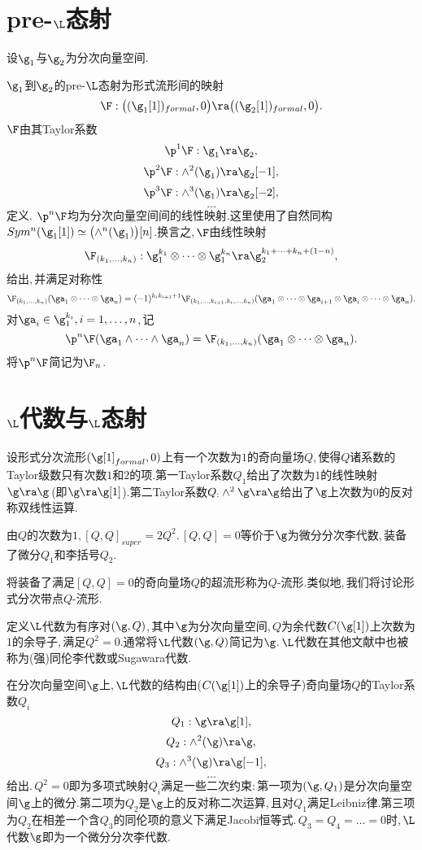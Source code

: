 \section{pre-$\L$态射}

设$\g_1$与$\g_2$为分次向量空间.

$\g_1$到$\g_2$的pre-$\L$态射为形式流形间的映射
$$\F:\bigl((\g_1[1])_{formal},0\bigr)\ra \bigl((\g_2[1])_{formal},0\bigr).$$
$\F$由其Taylor系数
$$\p^1 \F:\g_1\ra \g_2,$$
$$\p^2 \F:\wedge^2(\g_1)\ra \g_2[-1],$$
$$\p^3 \F:\wedge^3(\g_1)\ra \g_2[-2],$$
 $$\dots$$
定义.\,\,$\p^n \F$均为分次向量空间间的线性映射.这里使用了自然同构\\
$Sym^n(\g_1[1])\simeq 
\bigl(\wedge ^n(\g_1)\bigr)[n]$.换言之,\,$\F$由线性映射
$$\F_{(k_1,\dots,k_n)}: \g_1^{k_1}\otimes\dots\otimes \g_1^{k_n}\ra 
   \g_2^{k_1+\dots+k_n+(1-n)},$$
给出,\,并满足对称性
$$\F_{(k_1,\dots,k_n)}(\ga_1\otimes\dots\otimes \ga_n)=
   (-1)^{k_i k_{i+1}+1}
   \F_{(k_1,\dots,k_{i+1},k_i,\dots,k_n)}(\ga_1\otimes\dots \otimes\ga_{i+1}
   \otimes\ga_i\otimes\dots\otimes \ga_n).$$
对$\ga_i\in \g_1^{k_i},i=1,\dots,n$,\,记
$$\p^n \F(\ga_1\wedge\dots\wedge\ga_n)=
   \F_{(k_1,\dots,k_n)}(\ga_1\otimes\dots\otimes \ga_n).$$
将$\p^n \F$简记为$\F_n$.



\section{$\L$代数与$\L$态射}

设形式分次流形$(\g[1]_{formal},0)$上有一个次数为$1$的奇向量场$Q$,\,使得$Q$诸系数的Taylor级数只有次数$1$和$2$的项.第一Taylor系数$Q_1$给出了次数为$1$的线性映射$\g\ra \g$\,(即$\g\ra \g[1]$).第二Taylor系数$Q_:\wedge ^2\g\ra \g$给出了$\g$上次数为$0$的反对称双线性运算.

由$Q$的次数为$1$,\,$[Q,Q]_{super}=2Q^2$.\,$[Q,Q]=0$等价于$\g$为微分分次李代数,\,装备了微分$Q_1$和李括号$Q_2$.

将装备了满足$[Q,Q]=0$的奇向量场$Q$的超流形称为$Q$-流形.类似地,\,我们将讨论形式分次带点$Q$-流形.

定义$\L$代数为有序对$(\g,Q)$,\,其中$\g$为分次向量空间,\,$Q$为余代数$C(\g [1])$上次数为$1$的余导子,\,满足$Q^2=0$.通常将$\L$代数$(\g,Q)$简记为$\g$.\,$\L$代数在其他文献中也被称为(强)同伦李代数或Sugawara代数.

在分次向量空间$\g$上,\,$\L$代数的结构由($C(\g [1])$上的余导子)奇向量场$Q$的Taylor系数$Q_i$
\\
 $$Q_1: \g\ra \g[1],$$
     $$Q_2: \wedge^2(\g)\ra \g,$$
     $$Q_3:\wedge^3(\g)\ra \g[-1],$$
      $$\dots$$
给出.\,$Q^2=0$即为多项式映射$Q_i$满足一些二次约束:\,第一项为$(\g, Q_1)$是分次向量空间$\g$上的微分.第二项为$Q_2$是$\g$上的反对称二次运算,\,且对$Q_1$满足Leibniz律.第三项为$Q_2$在相差一个含$Q_3$的同伦项的意义下满足Jacobi恒等式.\,$Q_3=Q_4=\dots=0$时,\,$\L$代数$\g$即为一个微分分次李代数.

